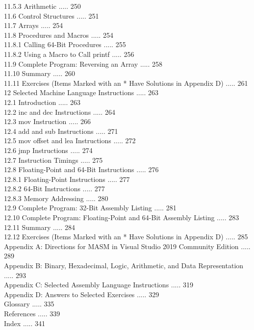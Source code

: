 \documentclass[10pt]{book}
\begin{document}
11.5.3 Arithmetic ..... 250\\
11.6 Control Structures ..... 251\\
11.7 Arrays ..... 254\\
11.8 Procedures and Macros ..... 254\\
11.8.1 Calling 64-Bit Procedures ..... 255\\
11.8.2 Using a Macro to Call printf ..... 256\\
11.9 Complete Program: Reversing an Array ..... 258\\
11.10 Summary ..... 260\\
11.11 Exercises (Items Marked with an * Have Solutions in Appendix D) ..... 261\\
12 Selected Machine Language Instructions ..... 263\\
12.1 Introduction ..... 263\\
12.2 inc and dec Instructions ..... 264\\
12.3 mov Instruction ..... 266\\
12.4 add and sub Instructions ..... 271\\
12.5 mov offset and lea Instructions ..... 272\\
12.6 jmp Instructions ..... 274\\
12.7 Instruction Timings ..... 275\\
12.8 Floating-Point and 64-Bit Instructions ..... 276\\
12.8.1 Floating-Point Instructions ..... 277\\
12.8.2 64-Bit Instructions ..... 277\\
12.8.3 Memory Addressing ..... 280\\
12.9 Complete Program: 32-Bit Assembly Listing ..... 281\\
12.10 Complete Program: Floating-Point and 64-Bit Assembly Listing ..... 283\\
12.11 Summary ..... 284\\
12.12 Exercises (Items Marked with an * Have Solutions in Appendix D) ..... 285\\
Appendix A: Directions for MASM in Visual Studio 2019 Community Edition ..... 289\\
Appendix B: Binary, Hexadecimal, Logic, Arithmetic, and Data Representation ..... 293\\
Appendix C: Selected Assembly Language Instructions ..... 319\\
Appendix D: Answers to Selected Exercises ..... 329\\
Glossary ..... 335\\
References ..... 339\\
Index ..... 341
\end{document}
